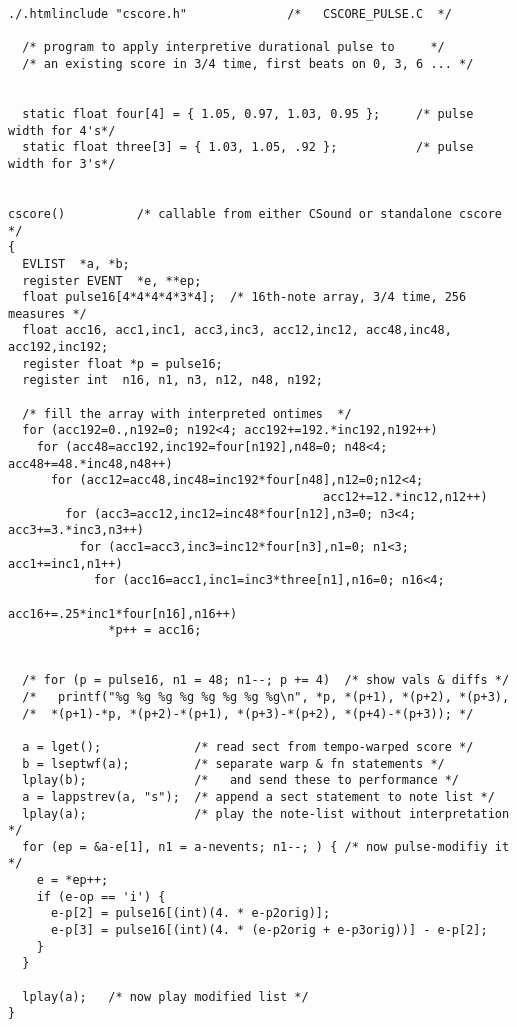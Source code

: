  


 
\begin{lstlisting}
./.htmlinclude "cscore.h"              /*   CSCORE_PULSE.C  */ 
  
  /* program to apply interpretive durational pulse to     */ 
  /* an existing score in 3/4 time, first beats on 0, 3, 6 ... */
  
  
  static float four[4] = { 1.05, 0.97, 1.03, 0.95 };     /* pulse width for 4's*/ 
  static float three[3] = { 1.03, 1.05, .92 };           /* pulse width for 3's*/ 
  
   
cscore()          /* callable from either CSound or standalone cscore  */ 
{ 
  EVLIST  *a, *b; 
  register EVENT  *e, **ep; 
  float pulse16[4*4*4*4*3*4];  /* 16th-note array, 3/4 time, 256 measures */ 
  float acc16, acc1,inc1, acc3,inc3, acc12,inc12, acc48,inc48, acc192,inc192; 
  register float *p = pulse16; 
  register int  n16, n1, n3, n12, n48, n192; 

  /* fill the array with interpreted ontimes  */ 
  for (acc192=0.,n192=0; n192<4; acc192+=192.*inc192,n192++) 
    for (acc48=acc192,inc192=four[n192],n48=0; n48<4; acc48+=48.*inc48,n48++) 
      for (acc12=acc48,inc48=inc192*four[n48],n12=0;n12<4; 
                                            acc12+=12.*inc12,n12++) 
        for (acc3=acc12,inc12=inc48*four[n12],n3=0; n3<4; acc3+=3.*inc3,n3++) 
          for (acc1=acc3,inc3=inc12*four[n3],n1=0; n1<3; acc1+=inc1,n1++) 
            for (acc16=acc1,inc1=inc3*three[n1],n16=0; n16<4; 
                                            acc16+=.25*inc1*four[n16],n16++) 
              *p++ = acc16; 
   
  
  /* for (p = pulse16, n1 = 48; n1--; p += 4)  /* show vals & diffs */ 
  /*   printf("%g %g %g %g %g %g %g %g\n", *p, *(p+1), *(p+2), *(p+3), 
  /*  *(p+1)-*p, *(p+2)-*(p+1), *(p+3)-*(p+2), *(p+4)-*(p+3)); */ 
  
  a = lget();             /* read sect from tempo-warped score */ 
  b = lseptwf(a);         /* separate warp & fn statements */ 
  lplay(b);               /*   and send these to performance */ 
  a = lappstrev(a, "s");  /* append a sect statement to note list */ 
  lplay(a);               /* play the note-list without interpretation */ 
  for (ep = &a-e[1], n1 = a-nevents; n1--; ) { /* now pulse-modifiy it */ 
    e = *ep++; 
    if (e-op == 'i') { 
      e-p[2] = pulse16[(int)(4. * e-p2orig)]; 
      e-p[3] = pulse16[(int)(4. * (e-p2orig + e-p3orig))] - e-p[2]; 
    } 
  } 
  
  lplay(a);   /* now play modified list */
}
      
\end{lstlisting}


